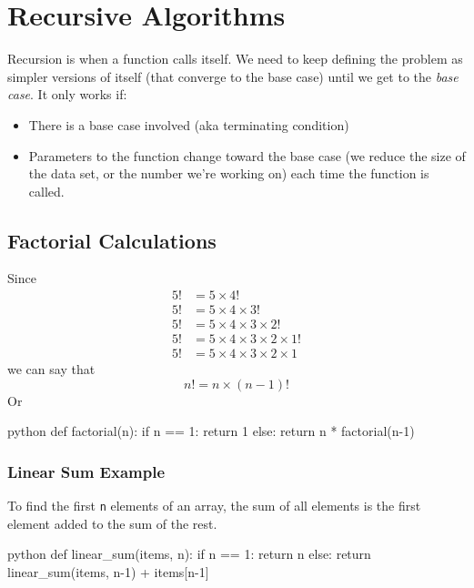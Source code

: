 \section{Recursive Algorithms}\label{sec:recursionpaten}

Recursion is when a function calls itself.
We need to keep defining the problem as simpler versions of itself (that converge to the base case) until we get to the \emph{base case}.
It only works if:
\begin{itemize}
    \item There is a base case involved (aka terminating condition)
    \item Parameters to the function change toward the base case (we reduce the size of the data set, or the number we're working on) each time the function is called.
\end{itemize}

\subsection{Factorial Calculations}\label{sub:factorial_calculations}

Since
\begin{align*}
    5! & = 5 \times 4!                            \\
    5! & = 5 \times 4 \times 3!                   \\
    5! & = 5 \times 4 \times 3 \times 2!          \\
    5! & = 5 \times 4 \times 3 \times 2 \times 1! \\
    5! & = 5 \times 4 \times 3 \times 2 \times 1
\end{align*}
we can say that
\[
    n! = n \times (n-1)!
\]
Or
\begin{code}{python}
def factorial(n):
    if n == 1:
        return 1
    else:
        return n * factorial(n-1)
\end{code}

\subsubsection{Linear Sum Example}\label{ssub:linear_sum_example}

To find the first \texttt{n} elements of an array, the sum of all elements is the first element added to the sum of the rest.
\begin{code}{python}
def linear_sum(items, n):
    if n == 1:
        return n
    else:
        return linear_sum(items, n-1) + items[n-1]
\end{code}

